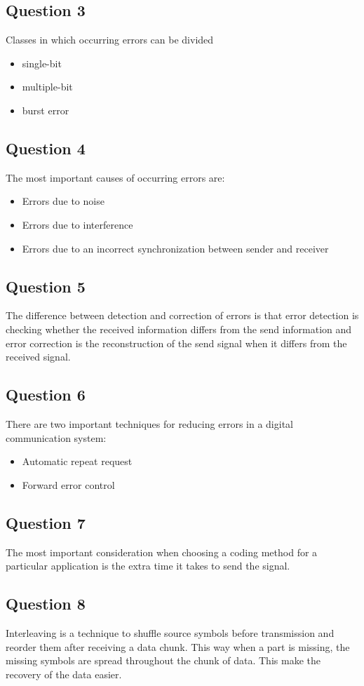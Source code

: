 \documentclass[final]{scrreprt} %
\begin{document}
\subsection{Question 3}
Classes in which occurring errors can be divided
\begin{itemize}
\item single-bit
\item multiple-bit
\item burst error
\end{itemize}
\subsection{Question 4}
The most important causes of occurring errors are:
\begin{itemize}
\item Errors due to noise
\item Errors due to interference
\item Errors due to an incorrect synchronization between sender and receiver
\end{itemize}
\subsection{Question 5}
The difference between detection and correction of errors is that error detection is checking whether the received information differs from the send information and error correction is the reconstruction of the send signal when it differs from the received signal. 
\subsection{Question 6}
There are two important techniques for reducing errors in a digital communication system:
\begin{itemize}
\item Automatic repeat request
\item Forward error control
\end{itemize}
\subsection{Question 7}
The most important consideration when choosing a coding method for a particular application is the extra time it takes to send the signal.
\subsection{Question 8}
Interleaving is a technique to shuffle source symbols before transmission and reorder them after receiving a data chunk.
This way when a part is missing, the missing symbols are spread throughout the chunk of data.
This make the recovery of the data easier.
\end{document}
